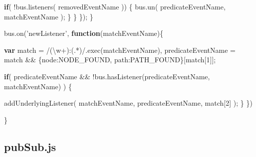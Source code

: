 \documentclass[12pt, ]{article}
\newenvironment{Shaded}{}{}
\newcommand{\KeywordTok}[1]{\textcolor[rgb]{0.00,0.44,0.13}{\textbf{{#1}}}}
\newcommand{\DataTypeTok}[1]{\textcolor[rgb]{0.56,0.13,0.00}{{#1}}}
\newcommand{\DecValTok}[1]{\textcolor[rgb]{0.25,0.63,0.44}{{#1}}}
\newcommand{\BaseNTok}[1]{\textcolor[rgb]{0.25,0.63,0.44}{{#1}}}
\newcommand{\FloatTok}[1]{\textcolor[rgb]{0.25,0.63,0.44}{{#1}}}
\newcommand{\StringTok}[1]{\textcolor[rgb]{0.25,0.44,0.63}{{#1}}}
\newcommand{\OtherTok}[1]{\textcolor[rgb]{0.00,0.44,0.13}{{#1}}}
\newcommand{\FunctionTok}[1]{\textcolor[rgb]{0.02,0.16,0.49}{{#1}}}
\newcommand{\NormalTok}[1]{{#1}}
\begin{document}
\begin{Shaded}
\begin{Highlighting}[]
            \KeywordTok{if}\NormalTok{( !}\OtherTok{bus}\NormalTok{.}\FunctionTok{listeners}\NormalTok{( removedEventName )) \{}
               \OtherTok{bus}\NormalTok{.}\FunctionTok{un}\NormalTok{( predicateEventName, matchEventName );}
            \NormalTok{\}}
         \NormalTok{\}}
      \NormalTok{\});   }
   \NormalTok{\}}

   \OtherTok{bus}\NormalTok{.}\FunctionTok{on}\NormalTok{(}\StringTok{'newListener'}\NormalTok{, }\KeywordTok{function}\NormalTok{(matchEventName)\{}

      \KeywordTok{var} \NormalTok{match = }\OtherTok{/}\FloatTok{(}\BaseNTok{\textbackslash{}w}\FloatTok{+)}\OtherTok{:}\FloatTok{(}\OtherTok{.}\FloatTok{*)}\OtherTok{/}\NormalTok{.}\FunctionTok{exec}\NormalTok{(matchEventName),}
          \NormalTok{predicateEventName = match && \{}\DataTypeTok{node}\NormalTok{:NODE_FOUND, }\DataTypeTok{path}\NormalTok{:PATH_FOUND\}[match[}\DecValTok{1}\NormalTok{]];}
                    
      \KeywordTok{if}\NormalTok{( predicateEventName && !}\OtherTok{bus}\NormalTok{.}\FunctionTok{hasListener}\NormalTok{(predicateEventName, matchEventName) ) \{  }
               
         \FunctionTok{addUnderlyingListener}\NormalTok{(}
            \NormalTok{matchEventName,}
            \NormalTok{predicateEventName, }
            \NormalTok{match[}\DecValTok{2}\NormalTok{]}
         \NormalTok{);}
      \NormalTok{\}    }
   \NormalTok{\})}

\NormalTok{\}}
\end{Highlighting}
\end{Shaded}

\pagebreak

\subsection{pubSub.js}\label{headerux5fpubSub}

\label{src_pubSub}
\end{document}
